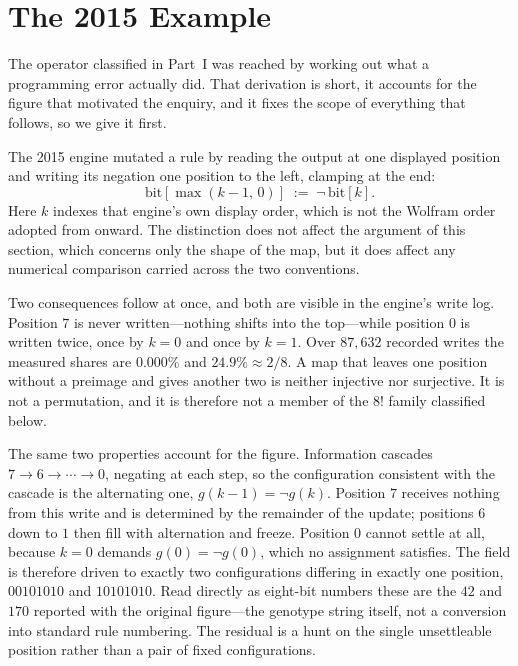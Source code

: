 \documentclass[man,12pt,floatsintext,donotrepeattitle]{apa7}
\newcommand{\bit}[1]{\mathrm{bit}[#1]}
\newcommand{\secref}[1]{\emph{\nameref{#1}}}
\begin{document}
\label{part:core}

\section{The 2015 Example}
\label{sec:warmup}

The operator classified in Part~I was reached by working out what a programming
error actually did. That derivation is short, it accounts for the figure that
motivated the enquiry, and it fixes the scope of everything that follows, so we
give it first.

The 2015 engine mutated a rule by reading the output at one displayed position
and writing its negation one position to the left, clamping at the end:
\[
  \bit{\max(k-1,\,0)} \;:=\; \lnot\,\bit{k}.
\]
Here $k$ indexes that engine's own display order, which is not the Wolfram order
adopted from \secref{sec:object} onward. The distinction does not affect the
argument of this section, which concerns only the shape of the map, but it does
affect any numerical comparison carried across the two conventions.

Two consequences follow at once, and both are visible in the engine's write log.
Position $7$ is never written---nothing shifts into the top---while position $0$
is written twice, once by $k=0$ and once by $k=1$. Over $87{,}632$ recorded
writes the measured shares are $0.000\%$ and $24.9\% \approx 2/8$. A map that
leaves one position without a preimage and gives another two is neither
injective nor surjective. It is not a permutation, and it is therefore not a
member of the $8!$ family classified below.

The same two properties account for the figure. Information cascades
$7 \to 6 \to \cdots \to 0$, negating at each step, so the configuration
consistent with the cascade is the alternating one, $g(k-1) = \lnot g(k)$.
Position $7$ receives nothing from this write and is determined by the remainder
of the update; positions $6$ down to $1$ then fill with alternation and freeze.
Position $0$ cannot settle at all, because $k=0$ demands $g(0) = \lnot g(0)$,
which no assignment satisfies. The field is therefore driven to exactly two
configurations differing in exactly one position, $00101010$ and $10101010$. Read
directly as eight-bit numbers these are the $42$ and $170$ reported with the
original figure---the genotype string itself, not a conversion into standard rule
numbering. The residual is a hunt on the single unsettleable position rather than
a pair of fixed configurations.
\end{document}

